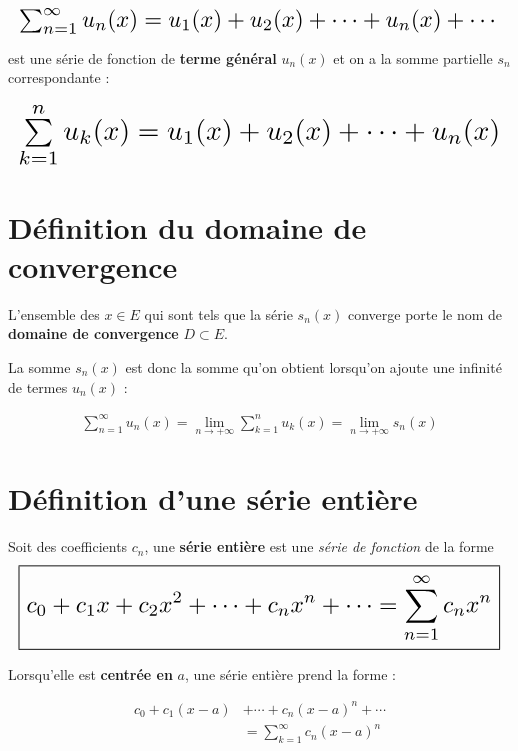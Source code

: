 \documentclass{report}
\begin{document}
\begin{multicols*}{3}
        \begin{align*}
        \resizebox{1\linewidth}{!}{$ 
            \sum_{n=1}^{\infty }u_n(x) = u_1(x) + u_2(x) + \cdots + u_n(x) + \cdots
        $}
        \end{align*}                    

    est une série de fonction de \textbf{terme général}  
    $u_n(x)$ et on a la somme partielle \( s_n \) correspondante : 


    \begin{align*}
    \resizebox{1\linewidth}{!}{$ 
        \sum\limits_{k=1}^{n}u_k(x) =  
        u_1(x) + u_2(x) + \cdots + u_n(x)
    $}
    \end{align*}
    
    \section{Définition du domaine de convergence}
    L'ensemble des $x \in E$ qui sont tels que la série $s_n(x)$ 
    converge porte le nom de  
    \textbf{\textcolor{myb}{domaine de convergence}} $D \subset E$.    

    La somme $s_n(x)$ est donc la somme qu'on obtient lorsqu'on 
    ajoute une infinité de termes $u_n(x)$ :
 
    \begin{align*}
    \boxed{
        \sum\limits_{n=1}^{\infty }u_n(x) = 
        \lim\limits_{n \to+\infty } 
        \sum\limits_{k=1}^{n}u_k(x) =  
        \lim\limits_{n \to +\infty } s_n(x) 
    }
    \end{align*}

    \vspace{-2em}
    \section{Définition d'une série entière}

    Soit des coefficients $c_n$, 
    une \textbf{série entière} est une \textit{série de fonction}     
    de la forme 
    \begin{align*}
    \resizebox{1\linewidth}{!}{$ 
    \boxed{
        c_0 + c_1x + c_2x^2 + \cdots + c_nx^n + \cdots = 
        \sum\limits_{n=1}^{\infty }  c_nx^n  
    }
$}
    \end{align*} 

    Lorsqu'elle est \textbf{centrée en} $a$, une série entière prend la forme : 

    \begin{align*}
            c_0 + c_1(x - a) &+ \cdots + c_n(x - a)^n + \cdots 
        \\
                            &= 
        \sum\limits_{k=1}^{\infty }  c_n(x - a)^n  
    \end{align*}    




\end{multicols*}
\end{document}
